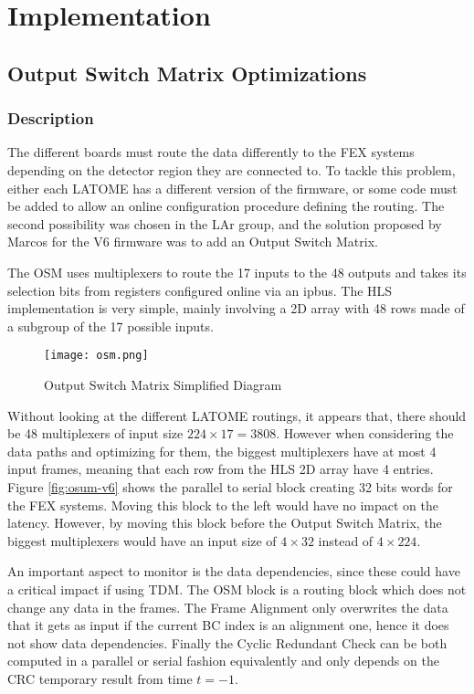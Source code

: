 \chapter{Implementation}\label{ch:implementation}

\section{Output Switch Matrix Optimizations}\label{sec:osm}
\subsection{Description}
The different boards must route the data differently to the FEX systems depending on the detector region they are connected to. To tackle this problem, either each LATOME has a different version of the firmware, or some code must be added to allow an online configuration procedure defining the routing. The second possibility was chosen in the LAr group, and the solution proposed by Marcos for the V6 firmware was to add an Output Switch Matrix. 

The OSM uses multiplexers to route the 17 inputs to the 48 outputs and takes its selection bits from registers configured online via an ipbus. The HLS implementation is very simple, mainly involving a 2D array with 48 rows made of a subgroup of the 17 possible inputs.

\begin{figure}
    \centering
    \texttt{[image: osm.png]}
    \caption{Output Switch Matrix Simplified Diagram}
    \label{fig:original-vhdl-design}
\end{figure}

Without looking at the different LATOME routings, it appears that, there should be 48 multiplexers of input size \(224\times17=3808\).
However when considering the data paths and optimizing for them, the biggest multiplexers have at most 4 input frames, meaning that each row from the HLS 2D array have 4 entries.
Figure \ref{fig:osum-v6} shows the parallel to serial block creating 32 bits words for the FEX systems. Moving this block to the left would have no impact on the latency. However, by moving this block before the Output Switch Matrix, the biggest multiplexers would have an input size of \(4\times32\) instead of \(4\times224\).

An important aspect to monitor is the data dependencies, since these could have a critical impact if using TDM. The OSM block is a routing block which does not change any data in the frames. The Frame Alignment only overwrites the data that it gets as input if the current BC index is an alignment one, hence it does not show data dependencies. Finally the Cyclic Redundant Check can be both computed in a parallel or serial fashion equivalently and only depends on the CRC temporary result from time \(t=-1\).


